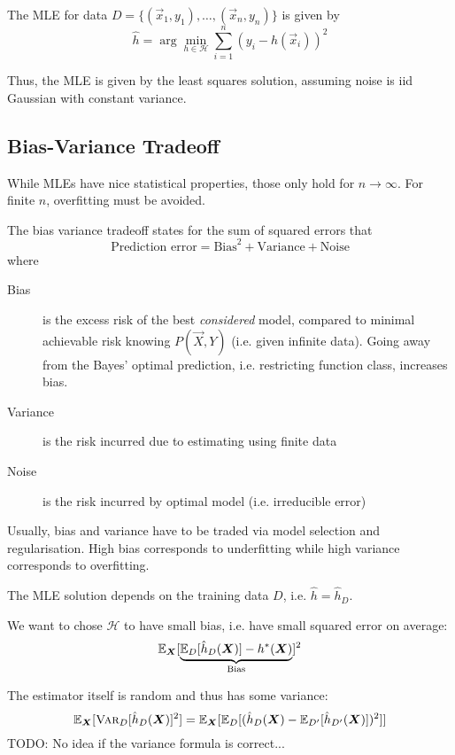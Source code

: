 The MLE for data $D = \{(\vec{x}_1, y_1), \dotsc, (\vec{x}_n, y_n)\}$
is given by
\begin{equation*}
    \hat{h} = \arg\min_{h \in \mathcal{H}}{
        \sum_{i=1}^n{(y_i - h(\vec{x}_i))^2}
    }
\end{equation*}

Thus, the MLE is given by the least squares
solution, assuming noise is iid Gaussian
with constant variance.


\subsection{Bias-Variance Tradeoff}
While MLEs have nice statistical properties,
those only hold for $n \to \infty$.
For finite $n$, overfitting must be avoided.

The bias variance tradeoff states
for the sum of squared errors that
\begin{equation*}
    \text{Prediction error} = \text{Bias}^2 + \text{Variance} + \text{Noise}
\end{equation*}
where
\begin{description}
    \item[Bias] is the excess risk of the best
    \emph{considered} model,
    compared to minimal achievable risk
    knowing $P(\vec{X}, Y)$
    (i.e. given infinite data).
    Going away from the Bayes' optimal
    prediction, i.e. restricting function
    class, increases bias.
    \item[Variance] is the risk incurred
    due to estimating using finite data
    \item[Noise] is the risk incurred by
    optimal model (i.e. irreducible error)
\end{description}

Usually, bias and variance have to be traded
via model selection and regularisation.
High bias corresponds to underfitting
while high variance corresponds to overfitting.

The MLE solution depends on the training data $D$,
i.e. $\hat{h} = \hat{h}_D$.

We want to chose $\mathcal{H}$ to have small bias,
i.e. have small squared error on average:
\begin{equation*}
    \mathbb{E}_{\boldsymbol{X}}[
        \underbrace{\mathbb{E}_D[\hat{h}_D(\boldsymbol{X})] - h^*(\boldsymbol{X})}_{\text{Bias}}
    ]^2
\end{equation*}

The estimator itself is random and
thus has some variance:
\begin{equation*}
    \mathbb{E}_{\boldsymbol{X}}[\textsc{Var}_D[\hat{h}_D(\boldsymbol{X})]^2]
    = \mathbb{E}_{\boldsymbol{X}}[
        \mathbb{E}_D[(
            \hat{h}_D(\boldsymbol{X}) - \mathbb{E}_{D'}[\hat{h}_{D'}(\boldsymbol{X})]
        )^2]
    ]
\end{equation*}
TODO: No idea if the variance formula is correct...

